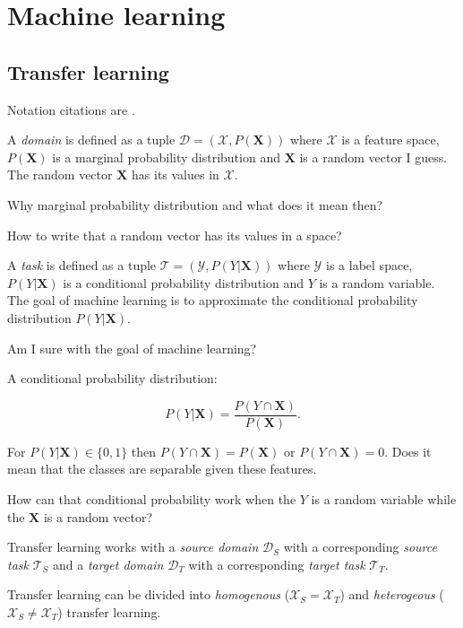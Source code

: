 \chapter{Machine learning}

\cite{goodfellow2016}

\section{Transfer learning}

Notation citations are \cite{pan2010, csurka2017}.

A \textit{domain} is defined as a tuple \(\mathcal{D} = (\mathcal{X}, P(\mathbf{X}))\) where \(\mathcal{X}\) is a feature space, \(P(\mathbf{X})\) is a marginal probability distribution and \(\mathbf{X}\) is a random vector I guess. The random vector \(\mathbf{X}\) has its values in \(\mathcal{X}\).

Why marginal probability distribution and what does it mean then?

How to write that a random vector has its values in a space?

A \textit{task} is defined as a tuple \(\mathcal{T} = (\mathcal{Y}, P(Y | \mathbf{X}))\) where \(\mathcal{Y}\) is a label space, \(P(Y | \mathbf{X})\) is a conditional probability distribution and \(Y\) is a random variable. The goal of machine learning is to approximate the conditional probability distribution \(P(Y | \mathbf{X})\).

Am I sure with the goal of machine learning?

A conditional probability distribution:

\begin{equation}
    P(Y | \mathbf{X}) = \frac{P(Y \cap \mathbf{X})}{P(\mathbf{X})}.
\end{equation}

For \(P(Y | \mathbf{X}) \in \{0, 1\}\) then \(P(Y \cap \mathbf{X}) = P(\mathbf{X})\) or \(P(Y \cap \mathbf{X}) = 0\). Does it mean that the classes are separable given these features.

How can that conditional probability work when the \(Y\) is a random variable while the \(\mathbf{X}\) is a random vector?

Transfer learning works with a \textit{source domain} \(\mathcal{D}_S\) with a corresponding \textit{source task} \(\mathcal{T}_S\) and a \textit{target domain} \(\mathcal{D}_T\) with a corresponding \textit{target task} \(\mathcal{T}_T\).

Transfer learning can be divided into \textit{homogenous} (\(\mathcal{X}_S = \mathcal{X}_T\)) and \textit{heterogeous} (\(\mathcal{X}_S \neq \mathcal{X}_T\)) transfer learning.

